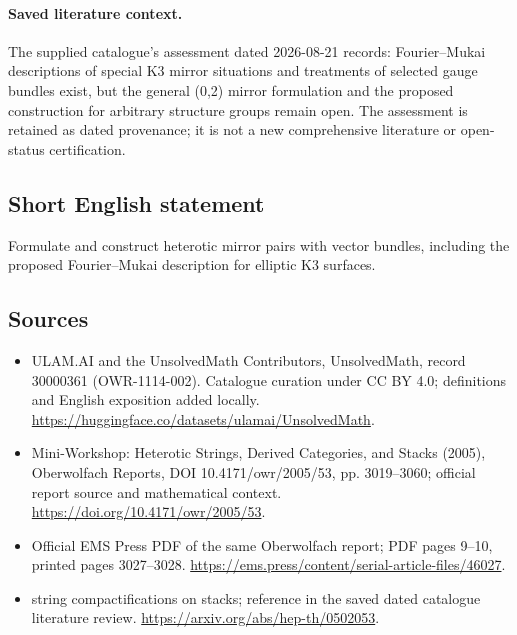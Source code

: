 \documentclass[11pt]{article}
\begin{document}
\paragraph{Saved literature context.} The supplied catalogue's assessment dated 2026-08-21 records: Fourier--Mukai descriptions of special K3 mirror situations and treatments of selected gauge bundles exist, but the general (0,2) mirror formulation and the proposed construction for arbitrary structure groups remain open. The assessment is retained as dated provenance; it is not a new comprehensive literature or open-status certification.
\subsection{Short English statement}
Formulate and construct heterotic mirror pairs with vector bundles, including the proposed Fourier--Mukai description for elliptic K3 surfaces.
\subsection{Sources}
\begin{itemize}
\item[\hypertarget{source:30000361:1}{S1}] ULAM.AI and the UnsolvedMath Contributors, UnsolvedMath, record 30000361 (OWR-1114-002). Catalogue curation under CC BY 4.0; definitions and English exposition added locally.
\url{https://huggingface.co/datasets/ulamai/UnsolvedMath}.
\item[\hypertarget{source:30000361:2}{S2}] Mini-Workshop: Heterotic Strings, Derived Categories, and Stacks (2005), Oberwolfach Reports, DOI 10.4171/owr/2005/53, pp. 3019--3060; official report source and mathematical context.
\url{https://doi.org/10.4171/owr/2005/53}.
\item[\hypertarget{source:30000361:3}{S3}] Official EMS Press PDF of the same Oberwolfach report; PDF pages 9--10, printed pages 3027--3028.
\url{https://ems.press/content/serial-article-files/46027}.
\item[\hypertarget{source:30000361:4}{S4}] string compactifications on stacks; reference in the saved dated catalogue literature review.
\url{https://arxiv.org/abs/hep-th/0502053}.
\end{itemize}
\label{end:30000361}
\end{document}
